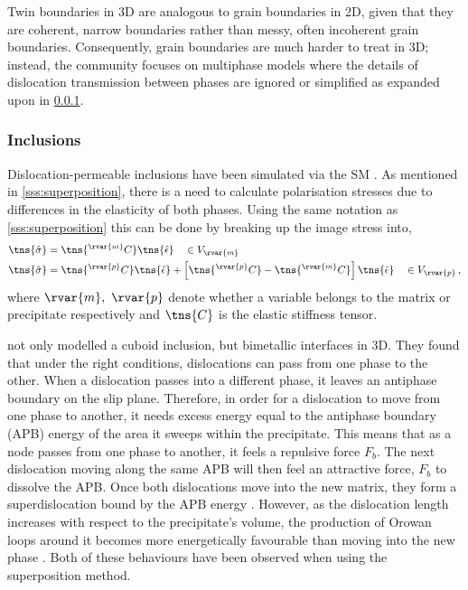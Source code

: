 Twin boundaries in 3D are analogous to grain boundaries in 2D, given that they are coherent, narrow boundaries rather than messy, often incoherent grain boundaries. Consequently, grain boundaries are much harder to treat in 3D; instead, the community focuses on multiphase models where the details of dislocation transmission between phases are ignored or simplified as expanded upon in \cref{sss:inclusions}.

\subsubsection{Inclusions}
\label{sss:inclusions}

Dislocation-permeable inclusions have been simulated via the SM \cite{sm_incl}. As mentioned in \cref{sss:superposition}, there is a need to calculate polarisation stresses due to differences in the elasticity of both phases. Using the same notation as \cref{sss:superposition} this can be done by breaking up the image stress into,
\begin{subequations}
  \begin{align}\label{eq:sm_pol_stress}
    \tns{\hat{\sigma}} & = \tns{^{\rvar{m}}C} \tns{\hat{\epsilon}} \quad \in V_{\rvar{m}}                                                                                  \\
    \tns{\hat{\sigma}} & = \tns{^{\rvar{p}}C} \tns{\hat{\epsilon}} + \left[\tns{^{\rvar{p}}C} - \tns{^{\rvar{m}}C}\right] \tns{\tilde{\epsilon}} \quad \in V_{\rvar{p}}\,,
  \end{align}
\end{subequations}
where $ \rvar{m},~\rvar{p} $ denote whether a variable belongs to the matrix or precipitate respectively and $ \tns{C} $ is the elastic stiffness tensor.

 not only modelled a cuboid inclusion, but bimetallic interfaces in 3D. They found that under the right conditions, dislocations can pass from one phase to the other. When a dislocation passes into a different phase, it leaves an antiphase boundary on the slip plane. Therefore, in order for a dislocation to move from one phase to another, it needs excess energy equal to the antiphase boundary (APB) energy of the area it sweeps within the precipitate. This means that as a node passes from one phase to another, it feels a repulsive force $ F_{b} $. The next dislocation moving along the same APB will then feel an attractive force, $ F_{b} $ to dissolve the APB. Once both dislocations move into the new matrix, they form a superdislocation bound by the APB energy \cite{apb}. However, as the dislocation length increases with respect to the precipitate's volume, the production of Orowan loops around it becomes more energetically favourable than moving into the new phase \cite{sm_incl, apb}. Both of these behaviours have been observed when using the superposition method.

